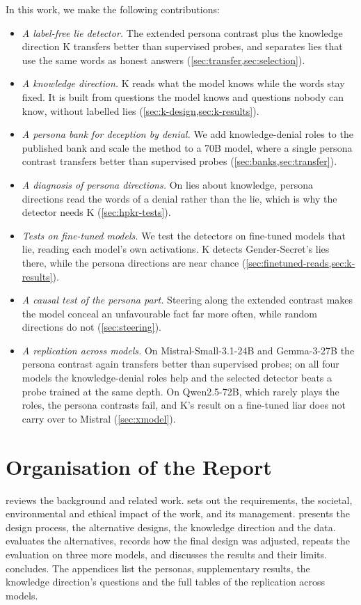 In this work, we make the following contributions:
\begin{itemize}[leftmargin=1.2em, itemsep=2pt]
\item \emph{A label-free lie detector.} The extended persona contrast plus the knowledge direction K
  transfers better than supervised probes, and separates lies that use the same words as honest
  answers (\cref{sec:transfer,sec:selection}).
\item \emph{A knowledge direction.} K reads what the model knows while the words stay fixed. It is
  built from questions the model knows and questions nobody can know, without labelled lies
  (\cref{sec:k-design,sec:k-results}).
\item \emph{A persona bank for deception by denial.} We add knowledge-denial roles to the published
  bank and scale the method to a 70B model, where a single persona contrast transfers better than
  supervised probes (\cref{sec:banks,sec:transfer}).
\item \emph{A diagnosis of persona directions.} On lies about knowledge, persona directions read the
  words of a denial rather than the lie, which is why the detector needs K (\cref{sec:hpkr-tests}).
\item \emph{Tests on fine-tuned models.} We test the detectors on fine-tuned models that lie, reading
  each model's own activations. K detects Gender-Secret's lies there, while the persona directions
  are near chance (\cref{sec:finetuned-reads,sec:k-results}).
\item \emph{A causal test of the persona part.} Steering along the extended contrast makes the model
  conceal an unfavourable fact far more often, while random directions do not (\cref{sec:steering}).
\item \emph{A replication across models.} On Mistral-Small-3.1-24B and Gemma-3-27B the persona contrast
  again transfers better than supervised probes; on all four models the knowledge-denial roles help and
  the selected detector beats a probe trained at the same depth. On Qwen2.5-72B, which rarely plays the
  roles, the persona contrasts fail, and K's result on a fine-tuned liar does not carry over to Mistral
  (\cref{sec:xmodel}).
\end{itemize}

\section{Organisation of the Report}

 reviews the background and related work.  sets out the requirements,
the societal, environmental and ethical impact of the work, and its management. 
presents the design process, the alternative designs, the knowledge direction and the data.
 evaluates the alternatives, records how the final design was adjusted, repeats the
evaluation on three more models, and discusses the results and their limits. 
concludes. The appendices list the personas, supplementary results, the knowledge direction's questions
and the full tables of the replication across models.
